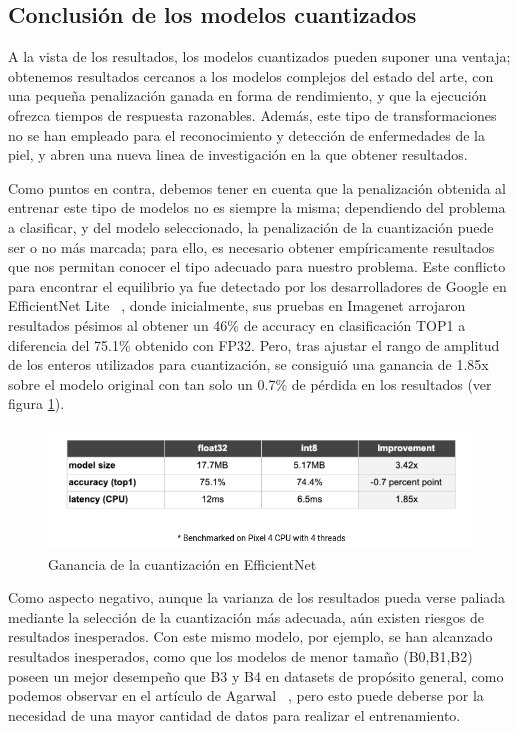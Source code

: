 \subsection{Conclusión de los modelos cuantizados}

A la vista de los resultados, los modelos cuantizados pueden suponer una ventaja; obtenemos resultados cercanos a los modelos complejos del estado del arte, con una pequeña penalización ganada en forma de rendimiento, y que la ejecución ofrezca tiempos de respuesta razonables. Además, este tipo de transformaciones no se han empleado para el reconocimiento y detección de enfermedades de la piel, y abren una nueva linea de investigación en la que obtener resultados.

Como puntos en contra, debemos tener en cuenta que la penalización obtenida al entrenar este tipo de modelos no es siempre la misma; dependiendo del problema a clasificar, y del modelo seleccionado, la penalización de la cuantización puede ser o no más marcada; para ello, es necesario obtener empíricamente resultados que nos permitan conocer el tipo adecuado para nuestro problema. Este conflicto para encontrar el equilibrio ya fue detectado por los desarrolladores de Google en EfficientNet Lite ~\cite{eflite,eflite2}, donde inicialmente, sus pruebas en Imagenet arrojaron resultados pésimos al obtener un 46\% de accuracy en clasificación TOP1 a diferencia del 75.1\% obtenido con FP32. Pero, tras ajustar el rango de amplitud de los enteros utilizados para cuantización, se consiguió una ganancia de 1.85x sobre el modelo original con tan solo un 0.7\% de pérdida en los resultados (ver figura \ref{gananciacuant}).

\begin{figure}[H]

	\centering
	\includegraphics[scale = 0.425]{imagenes/gananciacuant.png}
	\caption{Ganancia de la cuantización en EfficientNet \cite{eflite2}}
	\label{gananciacuant}
\end{figure}

Como aspecto negativo, aunque la varianza de los resultados pueda verse paliada mediante la selección de la cuantización más adecuada, aún existen riesgos de resultados inesperados. Con este mismo modelo, por ejemplo, se han alcanzado resultados inesperados, como que los modelos de menor tamaño (B0,B1,B2) poseen un mejor desempeño que B3 y B4 en datasets de propósito general, como podemos observar en el artículo de Agarwal  ~\cite{efliteworse}, pero esto puede deberse por la necesidad de una mayor cantidad de datos para realizar el entrenamiento.

